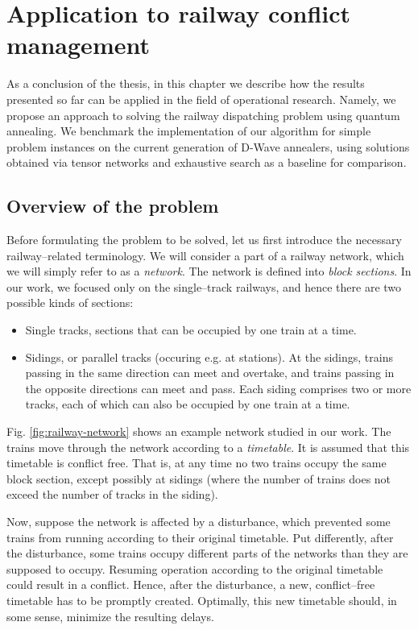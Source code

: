 \chapter{Application to railway conflict management}

As a conclusion of the thesis, in this chapter we describe how the results presented so far can be
applied in the field of operational research. Namely, we propose an approach to solving the railway
dispatching problem using quantum annealing. We benchmark the implementation of our algorithm for
simple problem instances on the current generation of D-Wave annealers, using solutions obtained via
tensor networks and exhaustive search as a baseline for comparison.


\section{Overview of the problem}
Before formulating the problem to be solved, let us first introduce the necessary railway--related
terminology. We will consider a part of a railway network, which we will simply refer to as a
\emph{network}. The network is defined into \emph{block sections}. In our work, we focused only on
the single--track railways, and hence there are two possible kinds of sections:
\begin{itemize}
    \item Single tracks, sections that can be occupied by one train at a time.
    \item Sidings, or parallel tracks (occuring e.g. at stations). At the sidings, trains passing
      in the same direction can meet and overtake, and trains passing in the opposite directions
      can meet and pass. Each siding comprises two or more tracks, each of which can also be
      occupied by one train at a time.
\end{itemize}

Fig. \ref{fig:railway-network} shows an example network studied in our work. The trains move
through the network according to a \emph{timetable}. It is assumed that this timetable is conflict
free. That is, at any time no two trains occupy the same block section, except possibly at sidings
(where the number of trains does not exceed the number of tracks in the siding).

Now, suppose the network is affected by a disturbance, which prevented some trains from running
according to their original timetable. Put differently, after the disturbance, some trains occupy
different parts of the networks than they are supposed to occupy. Resuming operation according to
the original timetable could result in a conflict. Hence, after the disturbance, a new, conflict--free timetable has to be promptly created. Optimally, this new timetable should, in some sense, minimize the resulting delays.

